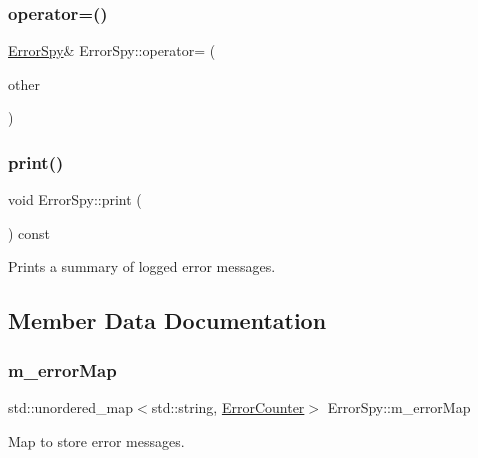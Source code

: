 \subsubsection{\texorpdfstring{operator=()}{operator=()}\hspace{0.1cm}{\footnotesize\ttfamily [2/2]}}
{\footnotesize\ttfamily \hyperlink{class_error_spy}{Error\+Spy}\& Error\+Spy\+::operator= (\begin{DoxyParamCaption}\item[{\hyperlink{class_error_spy}{Error\+Spy} \&\&}]{other }\end{DoxyParamCaption})\hspace{0.3cm}{\ttfamily [delete]}}

\mbox{\label{class_error_spy_a85e971684266e774c896ee681850614a}} 
\subsubsection{\texorpdfstring{print()}{print()}}
{\footnotesize\ttfamily void Error\+Spy\+::print (\begin{DoxyParamCaption}{ }\end{DoxyParamCaption}) const}



Prints a summary of logged error messages. 



\subsection{Member Data Documentation}
\mbox{\label{class_error_spy_a45fbb29e265512112996f3e94b5bff7a}} 
\subsubsection{\texorpdfstring{m\+\_\+error\+Map}{m\_errorMap}}
{\footnotesize\ttfamily std\+::unordered\+\_\+map$<$std\+::string, \hyperlink{class_error_counter}{Error\+Counter}$>$ Error\+Spy\+::m\+\_\+error\+Map\hspace{0.3cm}{\ttfamily [private]}}



Map to store error messages. 

